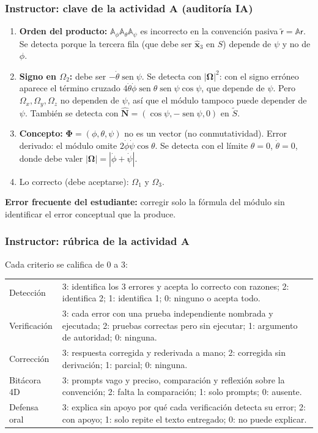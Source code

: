 \documentclass[spanish]{beamer}
\providecommand{\sen}{\operatorname{sen}}       %
\newcommand{\uv}[1]{\hat{\mathbf{#1}}}          %
\newcommand{\bOmega}{\bm{\Omega}}               %
\newcommand{\Rot}{\mathbb{A}}                   %
\newcommand{\Slab}{S}                           %
\newcommand{\Scue}{\tilde{S}}                   %
\newcommand{\colLab}[1]{\mathsf{#1}}            %
\newcommand{\colCue}[1]{\tilde{\mathsf{#1}}}    %
\begin{document}
\begin{frame}
  \frametitle{Instructor: clave de la actividad A (auditoría IA)}
  \footnotesize
  \begin{enumerate}
    \item \textbf{Orden del producto:} $\Rot_\phi\Rot_\theta\Rot_\psi$ es incorrecto en la
          convención pasiva $\colCue{r}=\Rot\colLab{r}$. Se detecta porque la tercera
          fila (que debe ser $\uv{x}_3$ en $\Slab$) depende de $\psi$ y no de $\phi$.
    \item \textbf{Signo en $\Omega_2$:} debe ser $-\dot\theta\sen\psi$. Se detecta con
          $|\bOmega|^2$: con el signo erróneo aparece el término cruzado
          $4\dot\theta\dot\phi\sen\theta\sen\psi\cos\psi$, que depende de $\psi$.
          Pero $\Omega_x,\Omega_y,\Omega_z$ no dependen de $\psi$, así que el módulo
          tampoco puede depender de $\psi$. También se detecta con $\uv{N}=(\cos\psi,-\sen\psi,0)$ en $\Scue$.
    \item \textbf{Concepto:} $\bm{\Phi}=(\phi,\theta,\psi)$ no es un vector (no
          conmutatividad). Error derivado: el módulo omite $2\dot\phi\dot\psi\cos\theta$.
          Se detecta con el límite $\theta=0$, $\dot\theta=0$, donde debe valer $|\bOmega|=|\dot\phi+\dot\psi|$.
    \item Lo correcto (debe aceptarse): $\Omega_1$ y $\Omega_3$.
  \end{enumerate}
  \textbf{Error frecuente del estudiante:} corregir solo la fórmula del módulo sin
  identificar el error conceptual que la produce.
\end{frame}

\begin{frame}
  \frametitle{Instructor: rúbrica de la actividad A}
  \footnotesize
  Cada criterio se califica de 0 a 3:

  \medskip
  \begin{tabular}{p{2.2cm}p{8.6cm}}
    Detección & 3: identifica los 3 errores y acepta lo correcto con razones;
                2: identifica 2; 1: identifica 1; 0: ninguno o acepta todo. \\
    Verificación & 3: cada error con una prueba independiente nombrada y ejecutada;
                   2: pruebas correctas pero sin ejecutar; 1: argumento de autoridad;
                   0: ninguna. \\
    Corrección & 3: respuesta corregida y rederivada a mano; 2: corregida sin
                 derivación; 1: parcial; 0: ninguna. \\
    Bitácora 4D & 3: prompts vago y preciso, comparación y reflexión sobre la
                  convención; 2: falta la comparación; 1: solo prompts; 0: ausente. \\
    Defensa oral & 3: explica sin apoyo por qué cada verificación detecta su error;
                   2: con apoyo; 1: solo repite el texto entregado; 0: no puede explicar.
  \end{tabular}
\end{frame}
\end{document}
